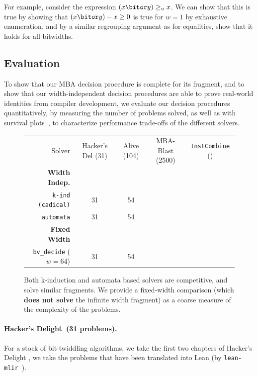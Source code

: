 For example, consider the expression $(x \bitor y) \geq_u x$.
We can show that this is true by showing that $(x \bitor y) - x \geq 0$ is true for $w = 1$ by exhaustive enumeration,
and by a similar regrouping argument as for equalities, show that it holds for all bitwidths.

\subsection{Evaluation}
\label{sec:swbv:evaluation}

To show that our MBA decision procedure is complete for its fragment,
and to show that our width-independent decision procedures are able to prove real-world identities from compiler development,
we evaluate our decision procedures quantitatively, by measuring the number of problems solved,
as well as with survival plots~\cite{brain2017benchmarking}, to characterize performance trade-offs of the different solvers.

\begin{figure}[htb]
{\small
\begin{tabular}{rcccc}
  Solver & Hacker's Del (31) & Alive (104) &  MBA-Blast (2500) & \texttt{InstCombine} (\InstCombineTotalProblems{}) \\
\textbf{Width Indep.} & & & & \\
\rowcolor{gray!20}
  \texttt{k-ind (cadical)} & 31 & 54 & \MBAKInductionVerifiedNumSolved{} & \textbf{\InstCombineNormCircuitVerifiedNumSolved{}} \\
\rowcolor{gray!10}
\texttt{automata} & 31 & 54 & \MBAPresburgerNumSolved{} & \InstCombineNormPresburgerNumSolved{} \\
\textbf{Fixed Width} & & & & \\
\rowcolor{gray!10}
  \texttt{bv\_decide} ($w = 64$) & 31 & 54 & \MBABvDecideNumSolved{} & \InstCombineBvDecideNumSolved{}
\end{tabular}
}
\caption{Both k-induction and automata based solvers are competitive, and solve similar fragments.
  We provide a fixed-width comparison (which \textbf{does not solve} the infinite width fragment)
  as a coarse measure of the complexity of the problems.}
\label{fig:swbv:table-eval}
\end{figure}

\noindent \paragraph{Hacker's Delight~(31 problems).}
For a stock of bit-twiddling algorithms, we take the first two chapters of Hacker's Delight \cite{warren2013hacker},
we take the problems that have been translated into Lean (by \texttt{lean-mlir}~\cite{bhat2024verifying}).

